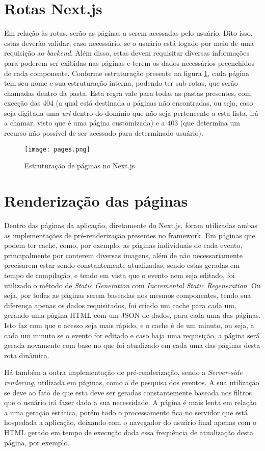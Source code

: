 \section{Rotas Next.js}
Em relação às rotas, serão as páginas a serem acessadas pelo usuário. Dito isso, estas deverão validar, caso necessário, se o usuário está logado por meio de uma requisição ao \textit{backend}. Além disso, estas devem requisitar diversas informações para poderem ser exibidas nas páginas e terem os dados necessários preenchidos de cada componente. Conforme estruturação presente na figura \ref{pages}, cada página tem seu nome e sua estruturação interna, podendo ter sub-rotas, que serão chamadas dentro da pasta. Esta regra vale para todas as pastas presentes, com exceção das 404 (a qual está destinada a páginas não encontradas, ou seja, caso seja digitada uma \textit{url} dentro do domínio que não seja pertencente a esta lista, irá a chamar, visto que é uma página customizada) e a 403 (que determina um recurso não possível de ser acessado para determinado usuário).
\begin{figure}[H]
    \caption{\label{pages}Estruturação de páginas no Next.js}
    \vspace{5pt}
    \centering
    \texttt{[image: pages.png]}
    \vspace{5pt}
\end{figure}

\section{Renderização das páginas}
Dentro das páginas da aplicação, diretamente do Next.js, foram utilizadas ambas as implementações de pré-renderização presentes no framework. Em páginas que podem ter cache, como, por exemplo, as páginas individuais de cada evento, principalmente por conterem diversas imagens, além de não necessariamente precisarem estar sendo constantemente atualizadas, sendo estas geradas em tempo de compilação, e tendo em vista que o evento nem seja editado, foi utilizado o método de \textit{Static Generation} com \textit{Incremental Static Regeneration}. Ou seja, por todas as páginas serem baseadas nos mesmos componentes, tendo sua diferença apenas os dados requisitados, foi criado um cache para cada um, gerando uma página HTML com um JSON de dados, para cada uma das páginas. Isto faz com que o acesso seja mais rápido, e o cache é de um minuto, ou seja, a cada um minuto se o evento for editado e caso haja uma requisição, a página será gerada novamente com base no que foi atualizado em cada uma das páginas desta rota dinâmica.

Há também a outra implementação de pré-renderização, sendo a \textit{Server-side rendering}, utilizada em páginas, como a de pesquisa dos eventos. A sua utilização se deve ao fato de que esta deve ser geradas constantemente baseada nos filtros que o usuário irá fazer dada a sua necessidade. A página é mais lenta em relação a uma geração estática, porém todo o processamento fica no servidor que está hospedada a aplicação, deixando com o navegador do usuário final apenas com o HTML gerado em tempo de execução dada essa frequência de atualização desta página, por exemplo.
